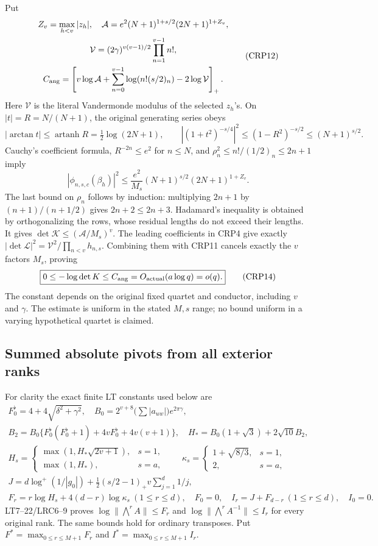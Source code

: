 Put
\[
\begin{gathered}
Z_v=\max_{h<v}|z_h|,\quad
\mathcal A=e^2(N+1)^{1+s/2}(2N+1)^{1+Z_v},\\
\mathcal V=(2\gamma)^{v(v-1)/2}\prod_{n=1}^{v-1}n!,\\
C_{\rm ang}=\left[v\log\mathcal A+
 \sum_{n=0}^{v-1}\log(n!(s/2)_n)-2\log\mathcal V\right]_+.
\end{gathered}\tag{CRP12}
\]
Here $\mathcal V$ is the literal Vandermonde modulus of the selected
$z_h$'s. On $|t|=R=N/(N+1)$, the original generating series obeys
\[
|\arctan t|\le\operatorname{artanh}R=\tfrac12\log(2N+1),\qquad
|(1+t^2)^{-s/4}|^2\le(1-R^2)^{-s/2}\le(N+1)^{s/2}.
\]
Cauchy's coefficient formula, $R^{-2n}\le e^2$ for $n\le N$, and
$\rho_n^2\le n!/(1/2)_n\le2n+1$ imply
\[
|\phi_{n,s,c}(\beta_h)|^2\le
 \frac{e^2}{M_s}(N+1)^{s/2}(2N+1)^{1+Z_v}.
\tag{CRP13}
\]
The last bound on $\rho_n$ follows by induction: multiplying $2n+1$
by $(n+1)/(n+1/2)$ gives $2n+2\le2n+3$. Hadamard's inequality is
obtained by orthogonalizing the rows, whose residual lengths do not
exceed their lengths. It gives $\det\mathcal K\le(\mathcal A/M_s)^v$.
The leading coefficients in CRP4 give exactly
$|\det\mathcal L|^2=\mathcal V^2/\prod_{n<v}h_{n,s}$.
Combining them with CRP11 cancels exactly the $v$ factors $M_s$, proving
\[
\boxed{0\le-\log\det K\le C_{\rm ang}
 =O_{\rm actual}(a\log q)=o(q).}\tag{CRP14}
\]
The constant depends on the original fixed quartet and conductor,
including $v$ and $\gamma$. The estimate is uniform in the stated
$M,s$ range; no bound uniform in a varying hypothetical quartet is
claimed.

\subsection{Summed absolute pivots from all exterior ranks}
For clarity the exact finite LT constants used below are
\[
\begin{gathered}
F_0^{\flat}=4+4\sqrt{\delta^2+\gamma^2},\quad
B_0=2^{v+8}\bigl(\sum|a_{uw}|\bigr)e^{2\pi\gamma},\\
B_2=B_0\{F_0^{\flat}(F_0^{\flat}+1)+4vF_0^{\flat}+4v(v+1)\},
\quad H_*=B_0(1+\sqrt3)+2\sqrt{10}B_2,\\
H_s=\begin{cases}\max(1,H_*\sqrt{2v+1}),&s=1,\\
\max(1,H_*),&s=a,\end{cases}\qquad
\kappa_s=\begin{cases}1+\sqrt{8/3},&s=1,\\2,&s=a,\end{cases}\\
J=d\log^+(1/|g_0|)+\tfrac12(s/2-1)_+v\sum_{j=1}^d1/j,\\
F_r=r\log H_s+4(d-r)\log\kappa_s\ (1\le r\le d),
\quad F_0=0,\quad I_r=J+F_{d-r}\ (1\le r\le d),\quad I_0=0.
\end{gathered}\tag{CRP15}
\]
LT7--22/LRC6--9 proves
$\log\|\bigwedge^r A\|\le F_r$ and
$\log\|\bigwedge^r A^{-1}\|\le I_r$ for every original rank.
The same bounds hold for ordinary transposes. Put
$F^*=\max_{0\le r\le M+1}F_r$ and
$I^*=\max_{0\le r\le M+1}I_r$.

